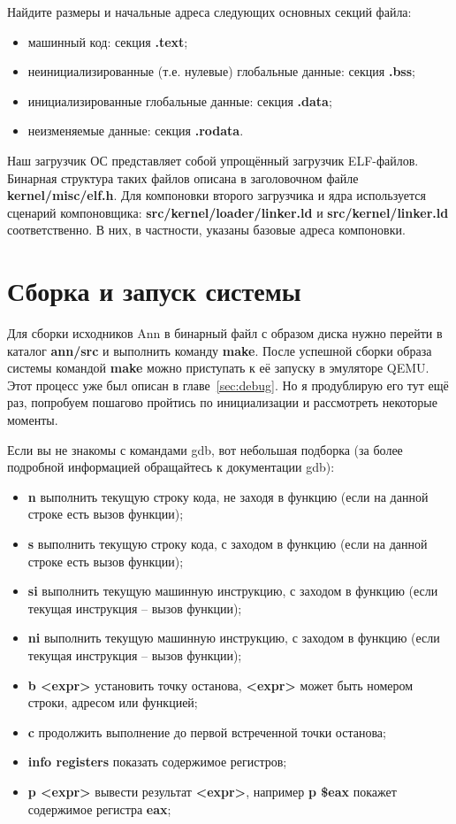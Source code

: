 Найдите размеры и начальные адреса следующих основных секций файла:
\begin{itemize}
\item машинный код: секция \textbf{.text};
\item неинициализированные (т.е. нулевые) глобальные данные: секция \textbf{.bss};
\item инициализированные глобальные данные: секция \textbf{.data};
\item неизменяемые данные: секция \textbf{.rodata}.
\end{itemize}

Наш загрузчик ОС представляет собой упрощённый загрузчик ELF-файлов.
Бинарная структура таких файлов описана в заголовочном файле \textbf{kernel/misc/elf.h}.
Для компоновки второго загрузчика и ядра используется сценарий компоновщика:
\textbf{src/kernel/loader/linker.ld} и \textbf{src/kernel/linker.ld} соответственно.
В них, в частности, указаны базовые адреса компоновки.

\section{Сборка и запуск системы}
Для сборки исходников Ann в бинарный файл с образом диска нужно перейти
в каталог \textbf{ann/src} и выполнить команду \textbf{make}. После
успешной сборки образа системы командой \textbf{make} можно приступать к её
запуску в эмуляторе QEMU. Этот процесс уже был описан в главе~\ref{sec:debug}.
Но я продублирую его тут ещё раз, попробуем пошагово пройтись по инициализации
и рассмотреть некоторые моменты.

Если вы не знакомы с командами gdb, вот небольшая подборка (за более
подробной информацией обращайтесь к документации gdb):
\begin{itemize}
\item \textbf{n} выполнить текущую строку кода, не заходя в функцию (если на данной строке есть вызов функции);
\item \textbf{s} выполнить текущую строку кода, с заходом в функцию (если на данной строке есть вызов функции);
\item \textbf{si} выполнить текущую машинную инструкцию, с заходом в функцию (если текущая инструкция -- вызов функции);
\item \textbf{ni} выполнить текущую машинную инструкцию, с заходом в функцию (если текущая инструкция -- вызов функции);
\item \textbf{b <expr>} установить точку останова, \textbf{<expr>} может быть номером строки, адресом или функцией;
\item \textbf{c} продолжить выполнение до первой встреченной точки останова;
\item \textbf{info registers} показать содержимое регистров;
\item \textbf{p <expr>} вывести результат \textbf{<expr>}, например \textbf{p \$eax} покажет содержимое регистра \textbf{eax};
\end{itemize}

